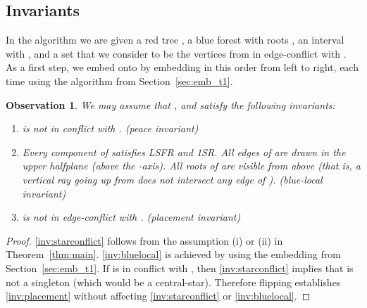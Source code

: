 \documentclass[11pt,a4paper,colorlinks=true,urlcolor=blue,citecolor=red]{article}
\theoremstyle{plain}
\newtheorem{observation}[theorem]{Observation}
\begin{document}
\subsection{Invariants}

In the algorithm we are given a red tree , a blue forest 
with roots , an interval  with
, and a set  that we consider to be the vertices from
 in edge-conflict with . As a first step, we embed  onto  by
embedding  in this order from left to right,
each time using the algorithm from Section~\ref{sec:emb_t1}.
\begin{observation}\label{obs:invariants}
  We may assume that ,  and  satisfy the following
  invariants:\normalfont
\begin{enumerate}[leftmargin=*,label={(I\arabic*)}]\setlength{\itemindent}{\labelsep}
  \item\label{inv:starconflict}  is not in conflict with .
    \emph{(peace invariant)}
  \item\label{inv:bluelocal} Every component of  satisfies LSFR and
    1SR. All edges of  are drawn in the upper halfplane (above the
    -axis).
All roots of  are visible from above (that is, a vertical ray
    going up from  does not intersect any edge of
    ). \emph{(blue-local invariant)}
  \item\label{inv:placement}  is not in edge-conflict with
    . \emph{(placement invariant)}
  \end{enumerate}
\end{observation}
\begin{proof}
  \ref{inv:starconflict} follows from the assumption (i) or (ii) in
  Theorem~\ref{thm:main}. \ref{inv:bluelocal} is achieved by using
  the embedding from Section~\ref{sec:emb_t1}. If  is in conflict
  with , then \ref{inv:starconflict} implies that  is not
  a singleton (which would be a central-star). Therefore flipping
   establishes \ref{inv:placement} without affecting
  \ref{inv:starconflict} or \ref{inv:bluelocal}.
\end{proof}
\end{document}
